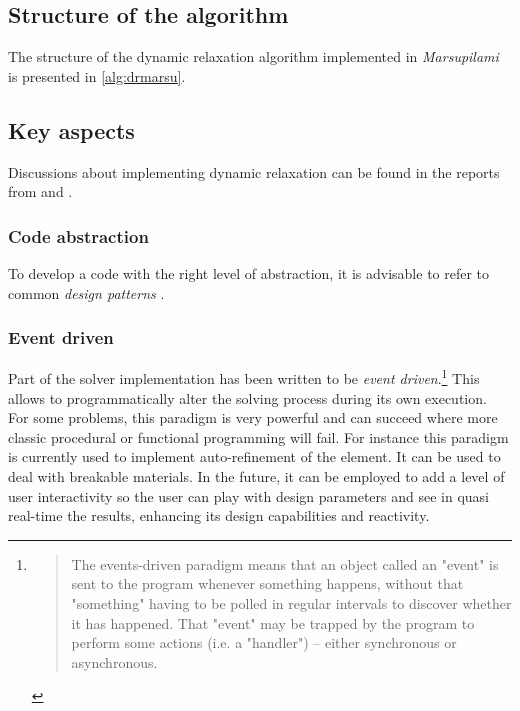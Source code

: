 \subsection{Structure of the algorithm}
The structure of the dynamic relaxation algorithm implemented in \emph{Marsupilami} is presented in \cref{alg:drmarsu}.

\afterpage{\IncMargin{2em}
	\begin{figure}[p]
	\begin{fullpage}
		
	\end{fullpage}
	\end{figure}
\DecMargin{2em}}



\subsection{Key aspects}
Discussions about implementing dynamic relaxation can be found in the reports from  and .


\subsubsection{Code abstraction}
To develop a code with the right level of abstraction, it is advisable to refer to common \emph{design patterns} \cite{Bishop2008, Clune2012}.


\subsubsection{Event driven}
Part of the solver implementation has been written to be \emph{event driven}.\footnote{\blockquote{The events-driven paradigm means that an object called an "event" is sent to the program whenever something happens, without that "something" having to be polled in regular intervals to discover whether it has happened. That "event" may be trapped by the program to perform some actions (i.e. a "handler") -- either synchronous or asynchronous.}} This allows to programmatically alter the solving process during its own execution. For some problems, this paradigm is very powerful and can succeed where more classic procedural or functional programming will fail. For instance this paradigm is currently used to implement auto-refinement of the element. It can be used to deal with breakable materials. In the future, it can be employed to add a level of user interactivity so the user can play with design parameters and see in quasi real-time the results, enhancing its design capabilities and reactivity.

